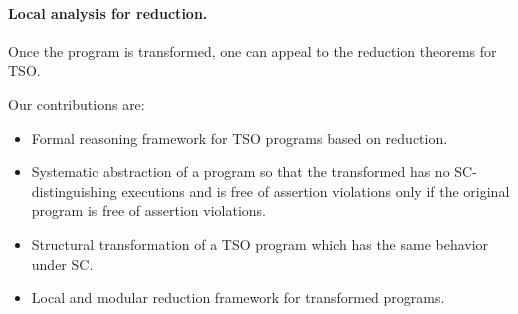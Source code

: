 \documentclass[preprint,9pt]{sigplanconf}
\begin{document}
\paragraph{Local analysis for reduction.}
Once the program is transformed, one can appeal to the reduction theorems for TSO.


Our contributions are:
\begin{itemize}
\item Formal reasoning framework for TSO programs based on reduction.
\item Systematic abstraction of a program so that the transformed has no SC-distinguishing executions and is free of assertion violations only if the original program is free of assertion violations.
\item Structural transformation of a TSO program which has the same behavior under SC.
\item Local and modular reduction framework for transformed programs.
\end{itemize}

\newcommand{\tsoalph}{\ensuremath{\Sigma}}
\newcommand{\aliprojx}[2]{\ensuremath{#1\downarrow_{#2}}}
\newcommand{\aliperm}{\ensuremath{\sim_{\pi}}}
\newcommand{\alipotso}{\ensuremath{<^{tso}}}
\newcommand{\alipotsox}[1]{\ensuremath{\alipotso_{#1}}}
\newcommand{\aliposc}{\ensuremath{<^{sc}}}
\newcommand{\aliposcx}[1]{\ensuremath{\aliposc_{#1}}}
\newcommand{\alimatch}{\ensuremath{\mu}}
\newcommand{\alimatchx}[1]{\ensuremath{\alimatch(#1)}}

\newtheorem{definition}{Definition}
\newtheorem{proposition}{Proposition}
\newtheorem{lemma}{Lemma}
\newtheorem{corollary}{Corollary}
\newtheorem{theorem}{Theorem}




\newcommand{\alisplit}{\ensuremath{\mathsf{Split}}}
\newcommand{\alisplitx}[1]{\ensuremath{\alisplit(#1)}}
\newcommand{\alisplitprogx}[1]{\ensuremath{#1^S}}
\newcommand{\aliloctrans}{\ensuremath{\tau_{l}}}
\newcommand{\aliloctransx}[1]{\ensuremath{\aliloctrans(#1)}}
\newcommand{\aliremtrans}{\ensuremath{\tau_{r}}}
\newcommand{\aliremtransx}[1]{\ensuremath{\aliremtrans(#1)}}
\newcommand{\aliequivgeneric}{\ensuremath{\simeq}}



\newcommand{\aliabsrulex}[1]{\textnormal{\sc\small #1}}
\newcommand{\alihavocval}{\ensuremath{\star}}
\end{document}
